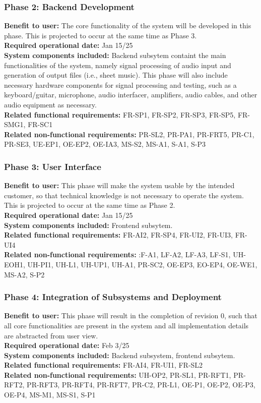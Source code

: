 \documentclass[12pt]{article}
\begin{document}
\subsubsection*{Phase 2: Backend Development}
\textbf{Benefit to user:} The core functionality of the system will be developed in this phase. This is projected to occur at the same time as Phase 3.\\
\textbf{Required operational date:} Jan 15/25 \\
\textbf{System components included:} Backend subsytem containt the main functionalities of the system, namely signal processing of audio input and generation of output files (i.e., sheet music). 
                                     This phase will also include necessary hardware components for signal processing and testing, such as a keyboard/guitar, microphone, audio interfacer, amplifiers, audio cables, and other audio equipment as necessary.\\
\textbf{Related functional requirements:} FR-SP1, FR-SP2, FR-SP3, FR-SP5, FR-SMG1, FR-SC1\\
\textbf{Related non-functional requirements:} PR-SL2, PR-PA1, PR-FRT5, PR-C1, PR-SE3, UE-EP1, OE-EP2, OE-IA3, MS-S2, MS-A1, S-A1, S-P3 \\

\subsubsection*{Phase 3: User Interface}
\textbf{Benefit to user:} This phase will make the system usable by the intended customer, so that technical knowledge is not necessary to operate the system. This is projected to occur at the same time as Phase 2. \\
\textbf{Required operational date:} Jan 15/25 \\
\textbf{System components included:} Frontend subsytem. \\
\textbf{Related functional requirements:} FR-AI2, FR-SP4, FR-UI2, FR-UI3, FR-UI4\\
\textbf{Related non-functional requirements:} :F-A1, LF-A2, LF-A3, LF-S1, UH-EOH1, UH-PI1, UH-L1, UH-UP1, UH-A1, PR-SC2, OE-EP3, EO-EP4, OE-WE1, MS-A2, S-P2 \\

\subsubsection*{Phase 4: Integration of Subsystems and Deployment}
\textbf{Benefit to user:} This phase will result in the completion of revision 0, such that all core functionalities are present in the system and all implementation details are abstracted from user view. \\
\textbf{Required operational date:} Feb 3/25 \\
\textbf{System components included:} Backend subsystem, frontend subsytem.\\
\textbf{Related functional requirements:} FR-AI4, FR-UI1, FR-SL2\\
\textbf{Related non-functional requirements:} UH-OP2, PR-SL1, PR-RFT1, PR-RFT2, PR-RFT3, PR-RFT4, PR-RFT7, PR-C2, PR-L1, OE-P1, OE-P2, OE-P3, OE-P4, MS-M1, MS-S1, S-P1 \\
\end{document}
